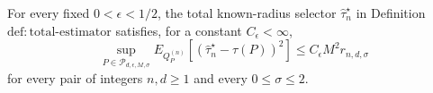 For every fixed \(0<\epsilon<1/2\), the total known-radius selector \(\widehat\tau_n^{\star}\) in Definition~\(\mathrm{def:total\text{-}estimator}\) satisfies, for a constant \(C_{\epsilon}<\infty\),
\[
 \sup_{P\in\mathcal P_{d,\epsilon,M,\sigma}}
 E_{Q_P^{(n)}}[(\widehat\tau_n^{\star}-\tau(P))^2]
 \le C_{\epsilon}M^2r_{n,d,\sigma}
\]
for every pair of integers \(n,d\ge1\) and every \(0\le\sigma\le2\).